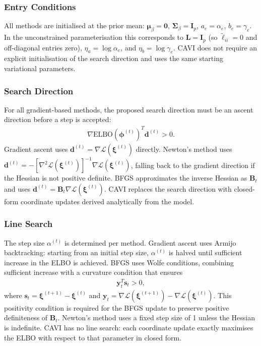 \documentclass[11pt,a4paper]{article}
\newcommand{\ELBO}{\text{ELBO}}
\begin{document}
\subsubsection*{Entry Conditions}

All methods are initialised at the prior mean: $\bm{\mu}_\beta = \bm{0}$, $\bm{\Sigma}_\beta = \bm{I}_p$, $a_e = \alpha_e$, $b_e = \gamma_e$. In the unconstrained parameterisation this corresponds to $\bm{L} = \bm{I}_p$ (so $\tilde{\ell}_{ii} = 0$ and off-diagonal entries zero), $\eta_a = \log \alpha_e$, and $\eta_b = \log \gamma_e$. CAVI does not require an explicit initialisation of the search direction and uses the same starting variational parameters.

\subsubsection*{Search Direction}

For all gradient-based methods, the proposed search direction must be an ascent direction before a step is accepted:
\begin{align}
\nabla \ELBO(\bm{\phi}^{(t)})^T \bm{d}^{(t)} > 0.
\end{align}
Gradient ascent uses $\bm{d}^{(t)} = \nabla\mathcal{L}(\bm{\xi}^{(t)})$ directly. Newton's method uses $\bm{d}^{(t)} = -[\nabla^2\mathcal{L}(\bm{\xi}^{(t)})]^{-1}\nabla\mathcal{L}(\bm{\xi}^{(t)})$, falling back to the gradient direction if the Hessian is not positive definite. BFGS approximates the inverse Hessian as $\bm{B}_t$ and uses $\bm{d}^{(t)} = \bm{B}_t \nabla\mathcal{L}(\bm{\xi}^{(t)})$. CAVI replaces the search direction with closed-form coordinate updates derived analytically from the model.

\subsubsection*{Line Search}

The step size $\alpha^{(t)}$ is determined per method. Gradient ascent uses Armijo backtracking: starting from an initial step size, $\alpha^{(t)}$ is halved until sufficient increase in the ELBO is achieved. BFGS uses Wolfe conditions, combining sufficient increase with a curvature condition that ensures
\begin{align}
\bm{y}_t^T \bm{s}_t > 0,
\end{align}
where $\bm{s}_t = \bm{\xi}^{(t+1)} - \bm{\xi}^{(t)}$ and $\bm{y}_t = \nabla\mathcal{L}(\bm{\xi}^{(t+1)}) - \nabla\mathcal{L}(\bm{\xi}^{(t)})$. This positivity condition is required for the BFGS update to preserve positive definiteness of $\bm{B}_t$. Newton's method uses a fixed step size of 1 unless the Hessian is indefinite. CAVI has no line search: each coordinate update exactly maximises the ELBO with respect to that parameter in closed form.
\end{document}
